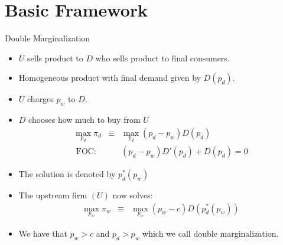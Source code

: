 \section{Basic Framework}
\begin{frame}{Double Marginalization}
\small
\begin{itemize}
\item $U$ sells product to $D$ who sells product to final consumers.
\item Homogeneous product with final demand given by $D(p_d)$.
\item $U$ charges $p_w$ to $D$.
\item $D$ chooses how much to buy from $U$
\begin{eqnarray*}
\max_{p_d} \pi_d &\equiv& \max_{p_d} (p_d-p_w) D(p_d) \\
\mbox{ FOC: }&&  (p_d - p_w) D'(p_d) + D(p_d) = 0
\end{eqnarray*}
\item The solution is denoted by $p_d^*(p_w)$
\item The upstream firm $(U)$ now solves:
\begin{eqnarray*}
\max_{p_w} \pi_w &\equiv& \max_{p_w} (p_w-c ) D(p_d^*(p_w)) 
\end{eqnarray*}
\item We have that $p_w  > c$ and $p_d > p_w$ which we call \alert{double marginalization}.
\end{itemize}
\end{frame}



